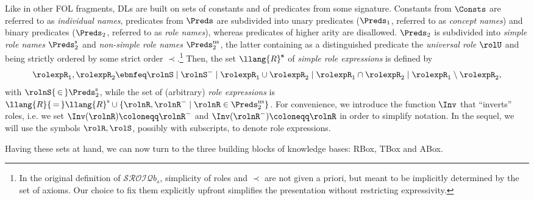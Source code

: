 \documentclass[10pt,a4paper]{amsart}
\theoremstyle{definition}
\numberwithin{equation}{section}
\theoremstyle{plain}
\theoremstyle{definition}
\theoremstyle{myexample}
\theoremstyle{plain}
\theoremstyle{definition}
\begin{document}
Like in other FOL fragments, DLs are built on sets of constants and of predicates from some signature. Constants from $\Consts$ are referred to as \emph{individual names}, predicates from $\Preds$ are subdivided into unary predicates ($\Preds_1$, referred to as \emph{concept names}) and binary predicates ($\Preds_2$, referred to as \emph{role names}), whereas predicates of higher arity are disallowed. $\Preds_2$ is subdivided into \emph{simple role names} $\Preds^\mathrm{s}_2$ and \emph{non-simple role names} $\Preds^\mathrm{ns}_2$, the latter containing as a distinguished predicate the \emph{universal role} $\rolU$ and being strictly ordered by some strict order $\prec$.\footnote{In the original definition of $\mathcal{SROIQ}b_s$, simplicity of roles and $\prec$ are not given a priori, but meant to be implicitly determined by the set of axioms. Our choice to fix them explicitly upfront simplifies the presentation without restricting expressivity.}
Then, the set $ \llang{R}^\mathbf{s}$ of \emph{simple role expressions} is defined by
$$
\rolexpR_1,\rolexpR_2 \ebnfeq \rolnS \mid \rolnS^- \mid \rolexpR_1\cup\rolexpR_2 \mid \rolexpR_1\cap\rolexpR_2 \mid \rolexpR_1\setminus\rolexpR_2,
$$%
with $\rolnS {\,\in\,} \Preds^\mathrm{s}_2$, while the set of (arbitrary) \emph{role expressions} is $ \llang{R} {\,=\,}  \llang{R}^\mathrm{s} \cup \{\rolnR, \rolnR^- \mid \rolnR \in \Preds^\mathrm{ns}_2\}$. 
For convenience, we introduce the function $\Inv$ that ``inverts'' roles, i.e. we set $\Inv(\rolnR)\coloneqq\rolnR^-$ and $\Inv(\rolnR^-) \coloneqq \rolnR$ in order to simplify notation. In the sequel, we will use the symbols $\rolR, \rolS$, possibly with subscripts, to denote role expressions.

Having these sets at hand, we can now turn to the three building blocks of \SROIQ{} knowledge bases: RBox, TBox and ABox.
\end{document}
